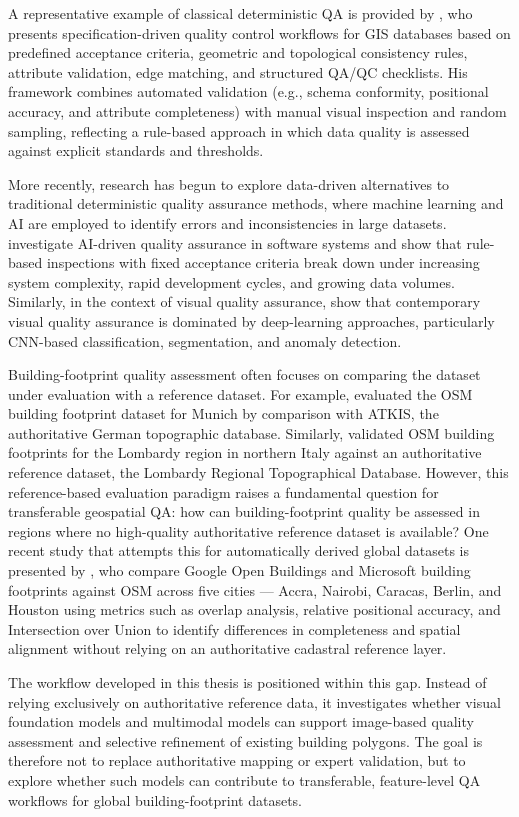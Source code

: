 A representative example of classical deterministic QA is provided by \cite{ahmed2023qualitymanagement}, who presents specification-driven quality control workflows for GIS databases based on predefined acceptance criteria, geometric and topological consistency rules, attribute validation, edge matching, and structured QA/QC checklists. His framework combines automated validation (e.g., schema conformity, positional accuracy, and attribute completeness) with manual visual inspection and random sampling, reflecting a rule-based approach in which data quality is assessed against explicit standards and thresholds.

More recently, research has begun to explore data-driven alternatives to traditional deterministic quality assurance methods, where machine learning and AI are employed to identify errors and inconsistencies in large datasets. \citet{Pysmennyi_2025AI_quality} investigate AI-driven quality assurance in software systems and show that rule-based inspections with fixed acceptance criteria break down under increasing system complexity, rapid development cycles, and growing data volumes. Similarly, in the context of visual quality assurance, \citet{Hoffmann_VisualQualityAssurance} show that contemporary visual quality assurance is dominated by deep-learning approaches, particularly CNN-based classification, segmentation, and anomaly detection.

Building-footprint quality assessment often focuses on comparing the dataset under evaluation with a reference dataset. For example, \citet{Hongchao_QualityAssesmentOSM} evaluated the OSM building footprint dataset for Munich by comparison with ATKIS, the authoritative German topographic database. Similarly, \citet{Brovelli_OSM_SpatialAccuracy} validated OSM building footprints for the Lombardy region in northern Italy against an authoritative reference dataset, the Lombardy Regional Topographical Database. However, this reference-based evaluation paradigm raises a fundamental question for transferable geospatial QA: how can building-footprint quality be assessed in regions where no high-quality authoritative reference dataset is available? One recent study that attempts this for automatically derived global datasets is presented by \citet{okyere2025evaluating}, who compare Google Open Buildings and Microsoft building footprints against OSM across five cities — Accra, Nairobi, Caracas, Berlin, and Houston using metrics such as overlap analysis, relative positional accuracy, and Intersection over Union to identify differences in completeness and spatial alignment without relying on an authoritative cadastral reference layer.

The workflow developed in this thesis is positioned within this gap. Instead of relying exclusively on authoritative reference data, it investigates whether visual foundation models and multimodal models can support image-based quality assessment and selective refinement of existing building polygons. The goal is therefore not to replace authoritative mapping or expert validation, but to explore whether such models can contribute to transferable, feature-level QA workflows for global building-footprint datasets.
